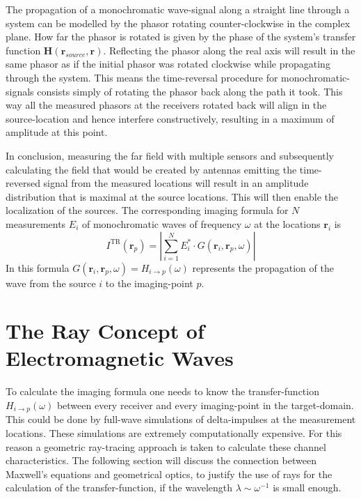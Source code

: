The propagation of a monochromatic wave-signal along a straight line through a system can be modelled by the phasor rotating counter-clockwise in the complex plane.
How far the phasor is rotated is given by the phase of the system's transfer function \(\bm{H}(\bm{r}_{source}, \bm{r})\).
Reflecting the phasor along the real axis will result in the same phasor as if the initial phasor was rotated clockwise while propagating through the system.
This means the time-reversal procedure for monochromatic-signals consists simply of rotating the phasor back along the path it took.
This way all the measured phasors at the receivers rotated back will align in the source-location and hence interfere constructively, resulting in a maximum of amplitude at this point.  

\vspace{1cm}
In conclusion, measuring the far field with multiple sensors and subsequently calculating the field that would be created by antennas emitting the time-reversed signal from the measured locations will result in an amplitude distribution that is maximal at the source locations.
This will then enable the localization of the sources. 
The corresponding imaging formula for \(N\) measurements \(E_i\) of monochromatic waves of frequency \(\omega \) at the locations \(\bm{r}_i\) is~\parencite{peng_zhang_comparison_2013}
\begin{equation}
    I^{\mathrm{\text{TR}}}\left(\bm{r}_p\right)=|\sum_{i=1}^N E_{i}^* \cdot G\left(\bm{r}_i, \bm{r}_p, \omega\right)|
\end{equation}
In this formula \(G(\bm{r}_i, \bm{r}_p, \omega) = H_{i\rightarrow p}(\omega)\) represents the propagation of the wave from the source \(i\) to the imaging-point \(p\).



\section{The Ray Concept of Electromagnetic Waves}\label{sec:ray-concept}
To calculate the imaging formula one needs to know the transfer-function \(H_{i\rightarrow p}(\omega)\) between every receiver and every imaging-point in the target-domain.
This could be done by full-wave simulations of delta-impulses at the measurement locations.
These simulations are extremely computationally expensive.
For this reason a geometric ray-tracing approach is taken to calculate these channel characteristics.
The following section will discuss the connection between Maxwell's equations and geometrical optics, to justify the use of rays for the calculation of the transfer-function, if the wavelength \(\lambda \sim \omega^{-1} \) is small enough.

